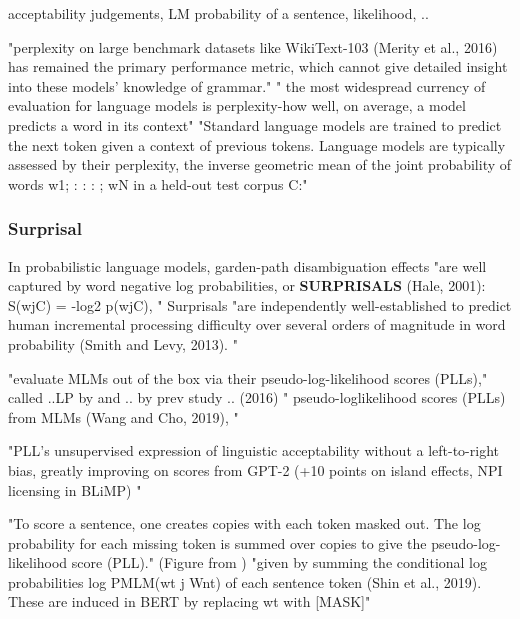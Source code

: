 acceptability judgements, LM probability of a sentence, likelihood, ..

"perplexity on large benchmark datasets like WikiText-103 (Merity et al., 2016) has remained the primary performance metric, which cannot give detailed insight into these models’ knowledge of grammar." \citep{warstadt2020blimp}
" the most widespread currency of evaluation for language models is perplexity-how well, on average, a model predicts a word in its context" \citep{hu2020systematic}
"Standard language models are trained to predict the next token given a context of previous tokens. Language models are typically assessed by their perplexity, the inverse geometric mean of the joint probability of words w1; : : : ; wN in a held-out test corpus C:" \citep{hu2020systematic}

\subsubsection{Surprisal}

In probabilistic language models, garden-path disambiguation effects "are well captured by word negative log probabilities, or \textbf{SURPRISALS} (Hale, 2001): S(wjC) = -log2 p(wjC), " \citep{hu2020systematic}
Surprisals "are independently well-established to predict human incremental processing difficulty over several orders of magnitude in word probability (Smith and Levy, 2013). " \citep{hu2020systematic}


"evaluate MLMs out of the box via their
pseudo-log-likelihood scores (PLLs)," \citep{salazar2020masked}
called ..LP by \citep{lau2020furiously} and .. by prev study .. (2016)
" pseudo-loglikelihood scores (PLLs) from MLMs (Wang and
Cho, 2019), " \citep{salazar2020masked}

"PLL’s unsupervised expression of linguistic acceptability without a
left-to-right bias, greatly improving on scores
from GPT-2 (+10 points on island effects, NPI
licensing in BLiMP) " \citep{salazar2020masked}

"To score a sentence, one creates copies
with each token masked out. The log probability for
each missing token is summed over copies to give the
pseudo-log-likelihood score (PLL)." (Figure from \citet{salazar2020masked})
"given by summing the conditional log
probabilities log PMLM(wt j Wnt) of each sentence token (Shin et al., 2019). These are induced
in BERT by replacing wt with [MASK]" \citep{salazar2020masked}

